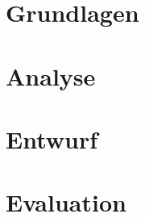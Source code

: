 



 

 \tableofcontents
 
 
 
 
 
 
 \chapter{Grundlagen}
 
 
 
 
  
 
 
  
 
 
 
 
 
 
 \chapter{Analyse}
 
 
 
 
 
 

 
 
 
 \chapter{Entwurf}
  
 
 
 
  
 \chapter{Evaluation}
 

